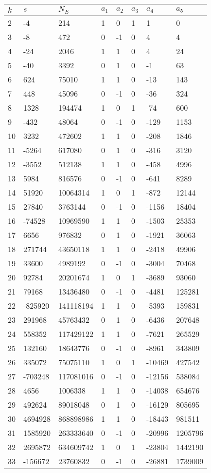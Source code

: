 \documentclass{amsart}
\begin{document}
\begin{longtable}{|l|l|l|lllll|}
\hline
$k$ & $s$ & $N_E$ & $a_1$ & $a_2$ & $a_3$ & $a_4$ & $a_5$\\
\hline
2&-4&214&1&0&1&1&0\\
3&-8&472&0&-1&0&4&4\\
4&-24&2046&1&1&0&4&24\\
5&-40&3392&0&1&0&-1&63\\
6&624&75010&1&1&0&-13&143\\
7&448&45096&0&-1&0&-36&324\\
8&1328&194474&1&0&1&-74&600\\
9&-432&48064&0&-1&0&-129&1153\\
10&3232&472602&1&1&0&-208&1846\\
11&-5264&617080&0&1&0&-316&3120\\
12&-3552&512138&1&1&0&-458&4996\\
13&5984&816576&0&-1&0&-641&8289\\
14&51920&10064314&1&0&1&-872&12144\\
15&27840&3763144&0&-1&0&-1156&18404\\
16&-74528&10969590&1&1&0&-1503&25353\\
17&6656&976832&0&1&0&-1921&36063\\
18&271744&43650118&1&1&0&-2418&49906\\
19&33600&4989192&0&-1&0&-3004&70468\\
20&92784&20201674&1&0&1&-3689&93060\\
21&79168&13436480&0&-1&0&-4481&125281\\
22&-825920&141118194&1&1&0&-5393&159831\\
23&291968&45763432&0&1&0&-6436&207648\\
24&558352&117429122&1&1&0&-7621&265529\\
25&132160&18643776&0&-1&0&-8961&343809\\
26&335072&75075110&1&0&1&-10469&427542\\
27&-703248&117081016&0&-1&0&-12156&538084\\
28&4656&1006338&1&1&0&-14038&654676\\
29&492624&89018048&0&1&0&-16129&805695\\
30&4694928&868898986&1&1&0&-18443&981511\\
31&1585920&263333640&0&-1&0&-20996&1205796\\
32&2695872&634609742&1&0&1&-23804&1442190\\
33&-156672&23760832&0&-1&0&-26881&1739009\\

\end{longtable}
\end{document}

